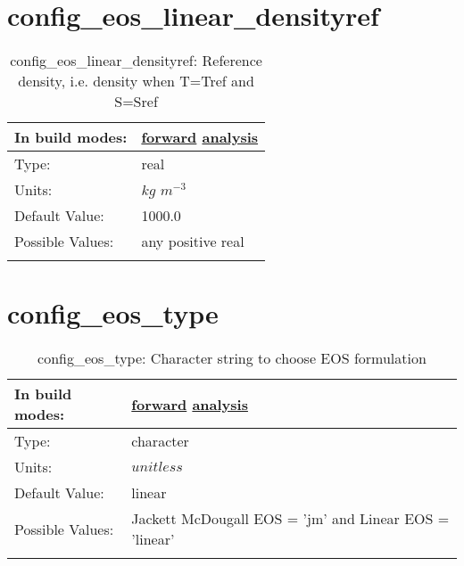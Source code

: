 \section[config\_eos\_linear\_densityref]{config\_eos\_linear\_densityref}
\label{sec:nm_sec_config_eos_linear_densityref}
\begin{center}
\begin{longtable}{| p{2.0in} || p{4.0in} |}
    \hline
    In build modes: & \hyperref[subsec:forward_nm_tab_eos_linear]{forward} \hyperref[subsec:analysis_nm_tab_eos_linear]{analysis} \\
    \hline
    Type: & real \\
    \hline
    Units: & $kg$ $m^{-3}$ \\
    \hline
    Default Value: & 1000.0 \\
    \hline
    Possible Values: & any positive real \\
    \hline
    \caption{config\_eos\_linear\_densityref: Reference density, i.e. density when T=Tref and S=Sref}
\end{longtable}
\end{center}
\section[config\_eos\_type]{config\_eos\_type}
\label{sec:nm_sec_config_eos_type}
\begin{center}
\begin{longtable}{| p{2.0in} || p{4.0in} |}
    \hline
    In build modes: & \hyperref[subsec:forward_nm_tab_eos]{forward} \hyperref[subsec:analysis_nm_tab_eos]{analysis} \\
    \hline
    Type: & character \\
    \hline
    Units: & $unitless$ \\
    \hline
    Default Value: & linear \\
    \hline
    Possible Values: & Jackett McDougall EOS = 'jm' and Linear EOS = 'linear' \\
    \hline
    \caption{config\_eos\_type: Character string to choose EOS formulation}
\end{longtable}
\end{center}
